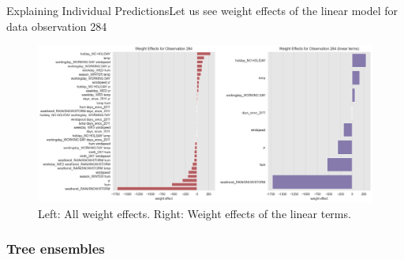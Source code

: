 \documentclass[10pt]{beamer}
\begin{document}
\begin{frame}{Explaining Individual Predictions}{Let us see weight effects of the linear model for data observation 284}
\begin{center}
  \begin{figure}
    \includegraphics[scale=0.3]{images/interpretable_ml_72_0.png}
    \caption{Left: All weight effects. Right: Weight effects of the linear terms.}\label{fig:linear-284-obs}
  \end{figure}
\end{center}
\end{frame}

\subsubsection{Tree ensembles}
\end{document}
